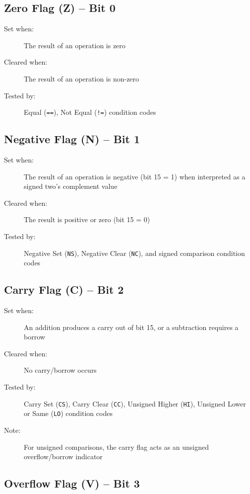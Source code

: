 \subsection{Zero Flag (Z) -- Bit 0}

\begin{description}
	\item[Set when:] The result of an operation is zero
	\item[Cleared when:] The result of an operation is non-zero
	\item[Tested by:] Equal (\texttt{==}), Not Equal (\texttt{!=}) condition codes
\end{description}

\subsection{Negative Flag (N) -- Bit 1}

\begin{description}
	\item[Set when:] The result of an operation is negative (bit 15 = 1) when interpreted as a signed two's complement value
	\item[Cleared when:] The result is positive or zero (bit 15 = 0)
	\item[Tested by:] Negative Set (\texttt{NS}), Negative Clear (\texttt{NC}), and signed comparison condition codes
\end{description}

\subsection{Carry Flag (C) -- Bit 2}

\begin{description}
	\item[Set when:] An addition produces a carry out of bit 15, or a subtraction requires a borrow
	\item[Cleared when:] No carry/borrow occurs
	\item[Tested by:] Carry Set (\texttt{CS}), Carry Clear (\texttt{CC}), Unsigned Higher (\texttt{HI}), Unsigned Lower or Same
	      (\texttt{LO}) condition codes
	\item[Note:] For unsigned comparisons, the carry flag acts as an unsigned overflow/borrow indicator
\end{description}

\subsection{Overflow Flag (V) -- Bit 3}

